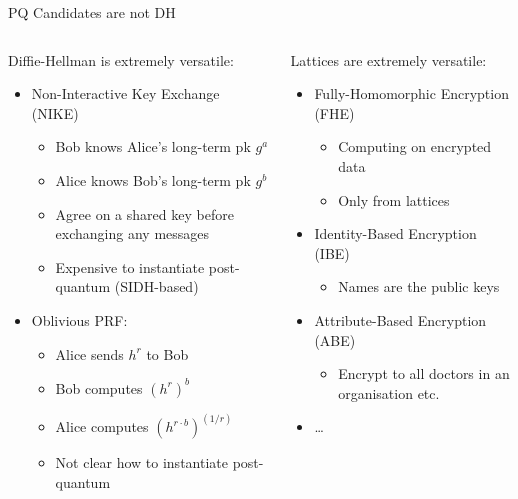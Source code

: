 \documentclass[xcolor=table,10pt,aspectratio=169]{beamer}
\begin{document}
\begin{frame}[label={sec:orgaaeccb0}]{PQ Candidates are not DH}
\begin{columns}[t]
\begin{column}{0.5\columnwidth}
Diffie-Hellman is extremely versatile:

\begin{itemize}
\item \alert{Non-Interactive} Key Exchange (NIKE)
\begin{itemize}
\item Bob knows Alice’s long-term pk \(g^a\)
\item Alice knows Bob’s long-term pk \(g^b\)
\item Agree on a shared key before exchanging any messages
\item Expensive to instantiate post-quantum (SIDH-based)
\end{itemize}
\item Oblivious PRF:
\begin{itemize}
\item Alice sends \(h^{r}\) to Bob
\item Bob computes \((h^{r})^b\)
\item Alice computes \((h^{r \cdot b})^{(1/r)}\)
\item Not clear how to instantiate post-quantum
\end{itemize}
\end{itemize}
\end{column}

\begin{column}{0.5\columnwidth}
Lattices are extremely versatile:

\begin{itemize}
\item Fully-Homomorphic Encryption (FHE)
\begin{itemize}
\item Computing on encrypted data
\item Only from lattices
\end{itemize}
\item Identity-Based Encryption (IBE)
\begin{itemize}
\item Names \alert{are} the public keys
\end{itemize}
\item Attribute-Based Encryption (ABE)
\begin{itemize}
\item Encrypt to all doctors in an organisation etc.
\end{itemize}
\item \ldots
\end{itemize}
\end{column}
\end{columns}
\end{frame}
\end{document}
